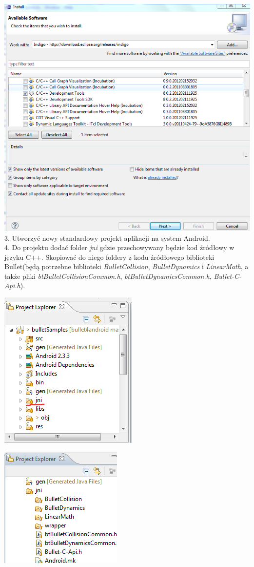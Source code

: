   \includegraphics[width=\textwidth]{./img/CDT.png}
  3. Utworzyć nowy standardowy projekt aplikacji na system Android.\\
  4. Do projektu dodać folder \emph{jni} gdzie przechowywany będzie kod źródłowy
  w języku C++. Skopiować do niego foldery z kodu źródłowego biblioteki
  Bullet(będą potrzebne biblioteki \emph{BulletCollision}, \emph{BulletDynamics}
  i \emph{LinearMath}, a także pliki \emph{btBulletCollisionCommon.h},
  \emph{btBulletDynamicsCommon.h}, \emph{Bullet-C-Api.h}).
  
  \begin{center}
  \includegraphics{./img/jni-folder.png}
  
  \includegraphics{./img/bulletFoldery.png}
  \end{center}
  
